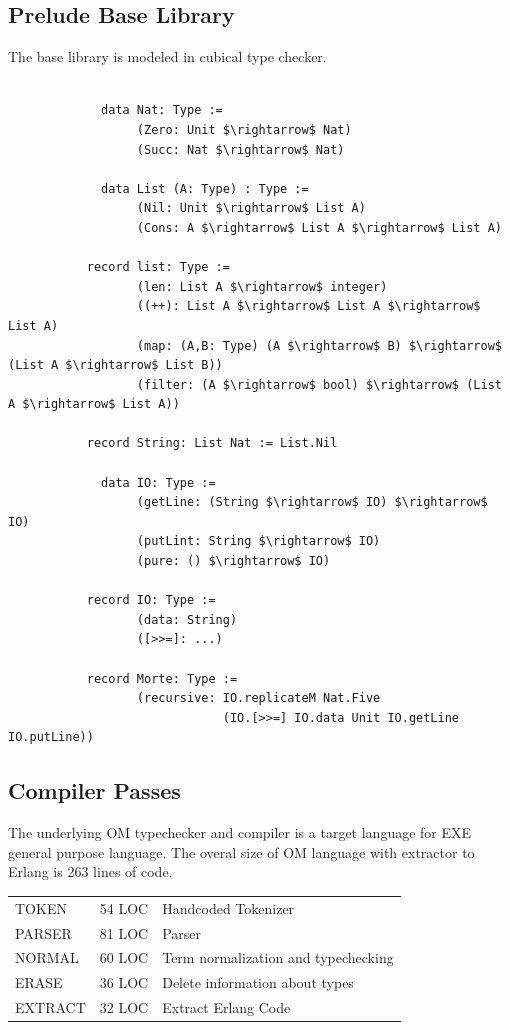 \documentclass[11pt,oneside]{article}
\begin{document}
\newpage
\subsection{Prelude Base Library}

The base library is modeled in cubical type checker.

\begin{lstlisting}[mathescape=true]

             data Nat: Type :=
                  (Zero: Unit $\rightarrow$ Nat)
                  (Succ: Nat $\rightarrow$ Nat)

             data List (A: Type) : Type :=
                  (Nil: Unit $\rightarrow$ List A)
                  (Cons: A $\rightarrow$ List A $\rightarrow$ List A)

           record list: Type :=
                  (len: List A $\rightarrow$ integer)
                  ((++): List A $\rightarrow$ List A $\rightarrow$ List A)
                  (map: (A,B: Type) (A $\rightarrow$ B) $\rightarrow$ (List A $\rightarrow$ List B))
                  (filter: (A $\rightarrow$ bool) $\rightarrow$ (List A $\rightarrow$ List A))

           record String: List Nat := List.Nil

             data IO: Type :=
                  (getLine: (String $\rightarrow$ IO) $\rightarrow$ IO)
                  (putLint: String $\rightarrow$ IO)
                  (pure: () $\rightarrow$ IO)

           record IO: Type :=
                  (data: String)
                  ([>>=]: ...)

           record Morte: Type :=
                  (recursive: IO.replicateM Nat.Five
                              (IO.[>>=] IO.data Unit IO.getLine IO.putLine))

\end{lstlisting}

\subsection{Compiler Passes}

The underlying OM typechecker and compiler is a target language for EXE general purpose language.
The overal size of OM language with extractor to Erlang is 263 lines of code.

\begin{center}
\begin{tabular}{lll}
   TOKEN   & 54 LOC & Handcoded Tokenizer\\
   PARSER  & 81 LOC & Parser\\
   NORMAL  & 60 LOC & Term normalization and typechecking\\
   ERASE   & 36 LOC & Delete information about types\\
   EXTRACT & 32 LOC & Extract Erlang Code\\
\end{tabular}
\end{center}
\end{document}
